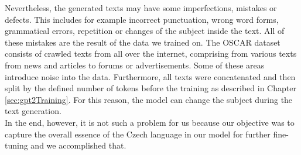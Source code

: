 Nevertheless, the generated texts may have some imperfections, mistakes or defects. This includes for example incorrect punctuation, wrong word forms, grammatical errors, repetition or changes of the subject inside the text. All of these mistakes are the result of the data we trained on. The OSCAR dataset consists of crawled texts from all over the internet, comprising from various texts from news and articles to forums or advertisements. Some of these areas introduce noise into the data. Furthermore, all texts were concatenated and then split by the defined number of tokens before the training as described in Chapter \ref{sec:gpt2Training}. For this reason, the model can change the subject during the text generation.\\

In the end, however, it is not such a problem for us because our objective was to capture the overall essence of the Czech language in our model for further fine-tuning and we accomplished that.

